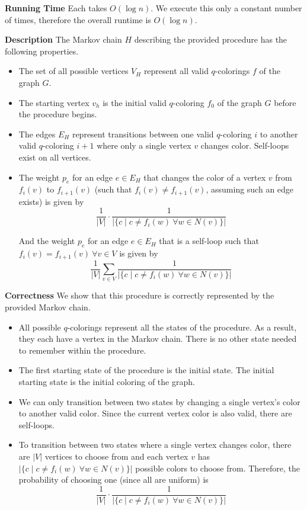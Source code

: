 \documentclass[12pt,twoside]{article}
\begin{document}
\begin{problems}
\begin{problemparts}
{\bf Running Time} Each  takes $O(\log n)$. We
execute this only a constant number of times, therefore the overall runtime
is $O(\log n)$.

\end{problemparts}

\newpage
\problem  %

\begin{problemparts}

\problempart %

{\bf Description} The Markov chain $H$ describing the provided procedure has
the following properties.

\begin{itemize}
  \item The set of all possible vertices $V_H$ represent all valid
  $q$-colorings $f$ of the graph $G$.
  \item The starting vertex $v_h$ is the initial valid $q$-coloring $f_0$ of
  the graph $G$ before the procedure begins.
  \item The edges $E_H$ represent transitions between one valid $q$-coloring
  $i$ to another valid $q$-coloring $i + 1$ where only a single vertex $v$
  changes color. Self-loops exist on all vertices.
  \item The weight $p_e$ for an edge $e \in E_H$ that changes the color of a
  vertex $v$ from $f_i(v)$ to $f_{i+1}(v)$ (such that $f_i(v) \neq f_{i +
  1}(v)$, assuming such an edge exists) is given by
  $$ \frac{1}{|V|} \cdot \frac{1}{|\{c \mid c \neq f_i(w)\ \forall w \in
  N(v)\}|} $$
  
  And the weight $p_e$ for an edge $e \in E_H$ that is a self-loop such that
  $f_i(v) = f_{i + 1}(v)\ \forall v \in V$ is given by
  $$ \frac{1}{|V|} \sum_{v \in V} \frac{1}{|\{c \mid c \neq f_i(w)\ \forall w
  \in N(v)\}|} $$
\end{itemize}

{\bf Correctness} We show that this procedure is correctly represented by the
provided Markov chain.

\begin{itemize}
  \item All possible $q$-colorings represent all the states of the procedure.
  As a result, they each have a vertex in the Markov chain. There is no other
  state needed to remember within the procedure.
  \item The first starting state of the procedure is the initial state. The
  initial starting state is the initial coloring of the graph.
  \item We can only transition between two states by changing a single
  vertex's color to another valid color. Since the current vertex color is
  also valid, there are self-loops.
  \item To transition between two states where a single vertex changes color,
  there are $|V|$ vertices to choose from and each vertex $v$ has $|\{c \mid
  c \neq f_i(w)\ \forall w \in N(v)\}|$ possible colors to choose from.
  Therefore, the probability of choosing one (since all are uniform) is 
  $$ \frac{1}{|V|} \cdot \frac{1}{|\{c \mid c \neq f_i(w)\ \forall w \in
  N(v)\}|} $$


\end{itemize}
\end{problemparts}
\end{problems}
\end{document}
